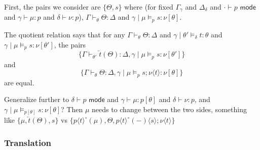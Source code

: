 \documentclass[10pt]{article}
\theoremstyle{definition}
\newcommand{\yields}{\vdash}
\newcommand{\type}{\,\,\mathsf{mode}}
\newcommand{\rewrite}[2]{\overleftarrow{#1}(#2)}
\newcommand\TermTwoT[5]{\ensuremath{#1 \mid #3 \vDash_{#5} #2 : #4}}
\newcommand\TrCirc[2]{\ensuremath{{#1}^\circ(#2)}}
\newcommand\var[1]{\ensuremath{\mathsf{var}_{#1}}}
\newcommand{\id}{\mathsf{id}}
\newcommand\ApEl[2]{\mathcal{T}_{#1}\langle#2\rangle}
\newcommand\ap[2]{\ensuremath{#1 \langle #2 \rangle }}
\begin{document}

  First, the pairs we consider are $\{ \Theta, s \}$ where (for fixed
  $\Gamma_\gamma$ and $\Delta_\delta$ and $\cdot \yields p \type$ and
  $\gamma \yields \mu : p$ and $\delta \yields \nu : p$), $\Gamma
  \yields_\theta \Theta : \Delta$ and
  $\TermTwoT{\gamma}{s}{\mu}{\nu[\theta]}{p}$.

  The quotient relation says that for any
  $\Gamma
  \yields_\theta \Theta : \Delta$ and
  $\TermTwoT{\gamma}{t}{\theta'}{\theta}{\delta}$
  and 
  $\TermTwoT{\gamma}{s}{\mu}{\nu[\theta']}{p}$, the pairs
  \[
  \{ \Gamma \yields_{\theta'} \rewrite{t}{\Theta} : \Delta,
  \TermTwoT{\gamma}{s}{\mu}{\nu[\theta']}{p}
  \}
  \]
  and
  \[
  \{ \Gamma \yields_{\theta} {\Theta} : \Delta,
  \TermTwoT{\gamma}{s;\ap{\nu}{t}}{\mu}{\nu[\theta]}{p}
  \}
  \]
  are equal.

  Generalize further to
    $\delta \yields p \type$ and
    $\gamma \yields \mu : p[\theta]$ and $\delta \yields \nu : p$, and
    $\TermTwoT{\gamma}{s}{\mu}{\nu[\theta]}{p[\theta]}$?
    Then $\mu$ needs to change between the two sides, something like
    $\{ \mu, \rewrite{t}{\Theta}, s \}$
    vs
    $\{ \TrCirc{\ap{p}{t}}{\mu}, \Theta, \ap{\TrCirc{\ap{p}{t}}{-}}{s};\ap{\nu}{t} \}$
    
\subsubsection{Translation}

\end{document}
